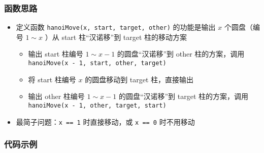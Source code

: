 \begin{frame}[fragile]
    \frametitle{函数思路}
    
    \begin{itemize}
        \item 定义函数 \lstinline|hanoiMove(x, start, target, other)| 的功能是输出 $x$ 个圆盘（编号 $1 \sim x$ ）从 start 柱“汉诺移”到 target 柱的移动方案
        \begin{itemize}
            \item 输出 start 柱编号 $1 \sim x - 1$ 的圆盘“汉诺移”到 other 柱的方案，调用 \lstinline|hanoiMove(x - 1, start, other, target)|
            \item 将 start 柱编号 $x$ 的圆盘移动到 target 柱，直接输出
            \item 输出 other 柱编号 $1 \sim x - 1$ 的圆盘“汉诺移”到 target 柱的方案，调用 \lstinline|hanoiMove(x - 1, other, target, start)|
        \end{itemize}
        \item 最简子问题：\lstinline|x == 1| 时直接移动，或 \lstinline|x == 0| 时不用移动
    \end{itemize}

\end{frame}

\begin{frame}[fragile]
    \frametitle{代码示例}
    
    

\end{frame}

